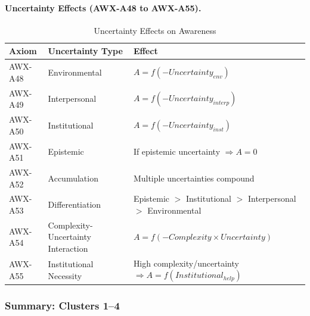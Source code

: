 \paragraph{Uncertainty Effects (AWX-A48 to AWX-A55).}

\begin{table}[htbp]
\centering
\caption{Uncertainty Effects on Awareness}
\label{tab:uncertainty-effects}
\renewcommand{\arraystretch}{1.3}
\begin{tabular}{@{}llp{5cm}@{}}
\toprule
\textbf{Axiom} & \textbf{Uncertainty Type} & \textbf{Effect} \\
\midrule
AWX-A48 & Environmental & $A = f(-Uncertainty_{env})$ \\
AWX-A49 & Interpersonal & $A = f(-Uncertainty_{interp})$ \\
AWX-A50 & Institutional & $A = f(-Uncertainty_{inst})$ \\
AWX-A51 & Epistemic & If epistemic uncertainty $\Rightarrow A = 0$ \\
AWX-A52 & Accumulation & Multiple uncertainties compound \\
AWX-A53 & Differentiation & Epistemic $>$ Institutional $>$ Interpersonal $>$ Environmental \\
AWX-A54 & Complexity-Uncertainty Interaction & $A = f(-Complexity \times Uncertainty)$ \\
AWX-A55 & Institutional Necessity & High complexity/uncertainty $\Rightarrow A = f(Institutional_{help})$ \\
\bottomrule
\end{tabular}
\end{table}

\subsubsection{Summary: Clusters 1--4}

